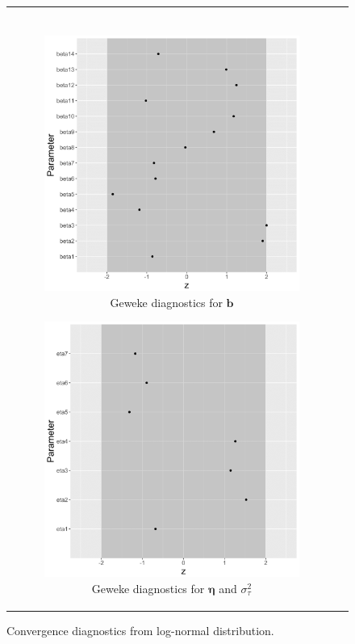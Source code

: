 \documentclass[ba]{imsart}
\numberwithin{equation}{section}
\theoremstyle{plain}
\begin{document}
\begin{figure}[H]
\begin{tabular}[t]{cc}
\begin{subfigure}[b]{0.495\textwidth}
				\end{subfigure}\\
				\begin{subfigure}[b]{0.495\textwidth}
					\caption{Geweke diagnostics for $\boldsymbol{b}$}
					\includegraphics[width=\textwidth]{img/betageweke-1.png}	
				\end{subfigure}
				\begin{subfigure}[b]{0.495\textwidth}
					\centering
					\caption{Geweke diagnostics for $\boldsymbol{\eta}$ and $\sigma^2_\tau$}
					\includegraphics[width=\textwidth]{img/etageweke-1.png}
				\end{subfigure}
			\end{tabular}
			\caption {Convergence diagnostics from log-normal distribution.}
			\label{figure:convergencediag}
		\end{figure}
\end{document}
